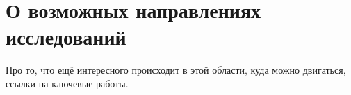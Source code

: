 \section{О возможных направлениях исследований}
\label{sec:Conclusion_ResearchDir}

Про то, что ещё интересного происходит в этой области, куда можно двигаться, ссылки на ключевые работы.

